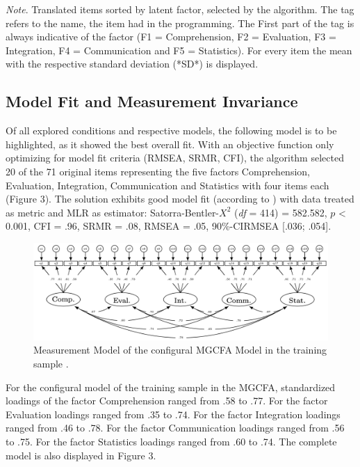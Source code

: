 \documentclass[
  12pt,
  a4paper,
  twoside]{article}
\begin{document}
\begin{table}[htpb]
\vspace{10pt}
\small\textit{Note}. Translated items sorted by latent factor, selected by the algorithm. 
The tag refers to the name, the item had in the programming. The First part of the tag is always indicative of the factor (F1 = Comprehension, F2 = Evaluation, F3 = Integration, F4 = Communication and F5 = Statistics). For every item the mean with the respective standard deviation (*SD*) is displayed.
\end{table}

\subsection{Model Fit and Measurement Invariance}\label{model-fit-and-measurement-invariance}

Of all explored conditions and respective models, the following model is to be highlighted, as it showed the best overall fit.
With an objective function only optimizing for model fit criteria (RMSEA, SRMR, CFI), the algorithm selected 20 of the 71 original items representing the five factors Comprehension, Evaluation, Integration, Communication and Statistics with four items each (Figure 3). The solution exhibits good model fit (according to ) with data treated as metric and MLR as estimator: Satorra-Bentler-\(X^{2}\) (\emph{df} = 414) = 582.582, \(p\) \textless{} 0.001, CFI = .96, SRMR = .08, RMSEA = .05, 90\%-CIRMSEA {[}.036; .054{]}.

\begin{figure}

{\centering \includegraphics[width=\textwidth]{images/Model5} 

}

\caption{Measurement Model of the configural MGCFA Model in the training sample .}\label{fig:figure3}
\end{figure}

For the configural model of the training sample in the MGCFA, standardized loadings of the factor Comprehension ranged from .58 to .77. For the factor Evaluation loadings ranged from .35 to .74. For the factor Integration loadings ranged from .46 to .78. For the factor Communication loadings ranged from .56 to .75. For the factor Statistics loadings ranged from .60 to .74. The complete model is also displayed in Figure 3.
\end{document}
